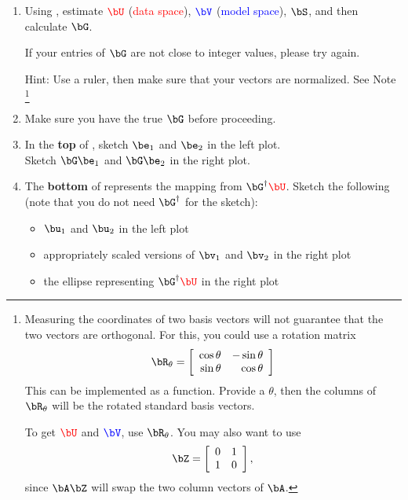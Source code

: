 \documentclass[11pt,titlepage,fleqn]{article}
\begin{document}
\begin{enumerate}
\item Using , estimate $\Ucolor$ (\textcolor{red}{data space}), $\Vcolor$ (\textcolor{blue}{model space}), $\bS$, and then calculate $\bG$.

If your entries of $\bG$ are not close to integer values, please try again.

Hint: Use a ruler, then make sure that your vectors are normalized. See Note \footnote{
Measuring the coordinates of two basis vectors will not guarantee that the two vectors are orthogonal. For this, you could use a rotation matrix
%
\begin{equation}
\bR_\theta = \left[
\begin{array}{rr}
\cos\theta & -\sin\theta \\ 
\sin\theta & \cos\theta
\end{array}
\right]
\end{equation}
%
This can be implemented as a function. Provide a $\theta$, then the columns of $\bR_\theta$ will be the rotated standard basis vectors.

To get $\Ucolor$ and $\Vcolor$, use $\bR_\theta$. You may also want to use
%
\begin{equation}
\bZ = \left[
\begin{array}{rr}
0 & 1 \\ 
1 & 0
\end{array}
\right],
\end{equation}
%
since $\bA\bZ$ will swap the two column vectors of $\bA$.
}

\item Make sure you have the true $\bG$ before proceeding.

\item In the {\bf top} of , sketch $\be_1$ and $\be_2$ in the left plot. \\
Sketch $\bG\be_1$ and $\bG\be_2$ in the right plot.

\item The {\bf bottom} of  represents the mapping from $\bG^{\dagger}\Ucolor$. Sketch the following (note that you do not need $\bG^{\dagger}$ for the sketch):
%
\begin{itemize}
\item $\bu_1$ and $\bu_2$ in the left plot
\item appropriately scaled versions of $\bv_1$ and $\bv_2$ in the right plot
\item the ellipse representing $\bG^{\dagger}\Ucolor$ in the right plot
\end{itemize}


\end{enumerate}
\end{document}
